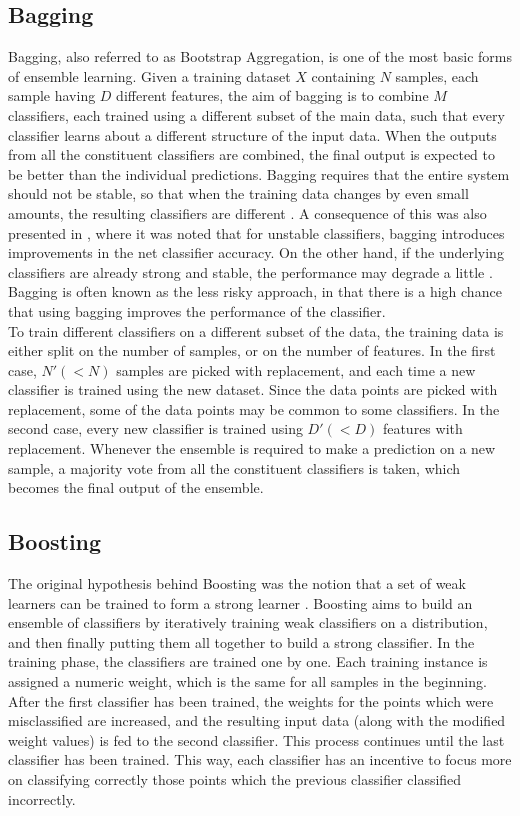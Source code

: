 \subsection{Bagging}
Bagging, also referred to as Bootstrap Aggregation, is one of the most basic forms of ensemble learning. Given a training dataset $X$ containing $N$ samples, each sample having $D$ different features, the aim of bagging is to combine $M$ classifiers, each trained using a different subset of the main data, such that every classifier learns about a different structure of the input data. When the outputs from all the constituent classifiers are combined, the final output is expected to be better than the individual predictions. Bagging requires that the entire system should not be stable, so that when the training data changes by even small amounts, the resulting classifiers are different \cite{quinlan1996bagging}. A consequence of this was also presented in \cite{breiman1996bagging}, where it was noted that for unstable classifiers, bagging introduces improvements in the net classifier accuracy. On the other hand, if the underlying classifiers are already strong and stable, the performance may degrade a little \cite{breiman1996bagging}. Bagging is often known as the less risky approach, in that there is a high chance that using bagging improves the performance of the classifier.\\

To train different classifiers on a different subset of the data, the training data is either split on the number of samples, or on the number of features. In the first case, $N' (< N)$ samples are picked with replacement, and each time a new classifier is trained using the new dataset. Since the data points are picked with replacement, some of the data points may be common to some classifiers. In the second case, every new classifier is trained using $D' (< D)$ features with replacement. Whenever the ensemble is required to make a prediction on a new sample, a majority vote from all the constituent classifiers is taken, which becomes the final output of the ensemble.

\subsection{Boosting}
The original hypothesis behind Boosting was the notion that a set of weak learners can be trained to form a strong learner \cite{kearns1988thoughts}. Boosting aims to build an ensemble of classifiers by iteratively training weak classifiers on a distribution, and then finally putting them all together to build a strong classifier. In the training phase, the classifiers are trained one by one. Each training instance is assigned a numeric weight, which is the same for all samples in the beginning. After the first classifier has been trained, the weights for the points which were misclassified are increased, and the resulting input data (along with the modified weight values) is fed to the second classifier. This process continues until the last classifier has been trained. This way, each classifier has an incentive to focus more on classifying correctly those points which the previous classifier classified incorrectly.\\

